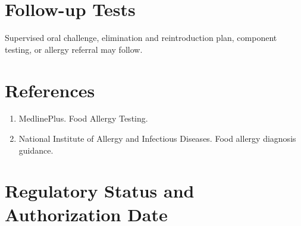 \section*{Follow-up Tests} Supervised oral challenge, elimination and reintroduction plan, component testing, or allergy referral may follow.
\section*{References} \begin{enumerate}\item MedlinePlus. Food Allergy Testing.\item National Institute of Allergy and Infectious Diseases. Food allergy diagnosis guidance.\end{enumerate}
\clearpage\section*{Regulatory Status and Authorization Date}\clearpage

